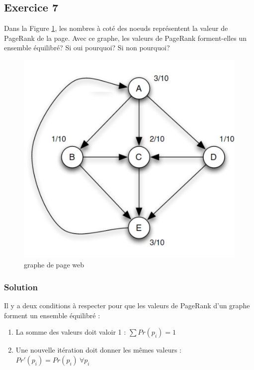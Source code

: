 \subsection*{Exercice 7}
Dans la Figure \ref{fig:equi}, les nombres à coté des noeuds représentent la valeur de PageRank de la page. Avec ce graphe, les valeurs de PageRank forment-elles un ensemble équilibré? Si oui pourquoi? Si non pourquoi?

\begin{figure}[ht!]
	\centering
	\includegraphics[scale=0.3]{figs/equi.png}
	\caption{graphe de page web}
	\label{fig:equi}
\end{figure}

    \subsubsection*{Solution}
    Il y a deux conditions à respecter pour que les valeurs de PageRank d'un graphe forment un ensemble équilibré :
    \begin{enumerate}
        \item La somme des valeurs doit valoir 1 : $\sum Pr(p_i) = 1$
        \item Une nouvelle itération doit donner les mêmes valeurs : $Pr'(p_i) = Pr(p_i) \ \forall p_i$\\
    \end{enumerate}
    
